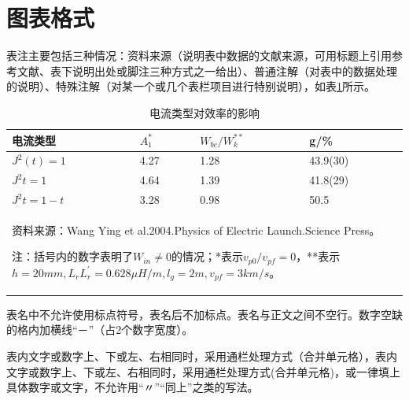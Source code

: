 \documentclass{cqupt_thesis}
\begin{document}
    \section{图表格式}
    表注主要包括三种情况：资料来源（说明表中数据的文献来源，可用标题上引用参考文献、表下说明出处或脚注三种方式之一给出）、普通注解（对表中的数据处理的说明）、特殊注解（对某一个或几个表栏项目进行特别说明），如表\ref{电流类型对效率的影响}所示。
    \begin{table}[H]%
        \centering
        \caption{电流类型对效率的影响}
        \label{电流类型对效率的影响}
        \begin{tabular}{p{3.5cm}p{3.5cm}p{3.5cm}p{3.5cm}}
            \hline
            电流类型           & {$ A_1^* $} & {$ W_{bc}/W_k^{**} $} & {g/\%}   \\
            \hline
            {$ J^2(t)=1 $} & 4.27        & 1.28                  & 43.9(30)            \\
            {$ J^2t=1 $}   & 4.64        & 1.39                  & 41.8(29)            \\
            {$ J^2t=1-t $} & 3.28        & 0.98                  & 50.5     \\
            \hline
            \multicolumn{4}{p{15cm}}{
                资料来源：Wang Ying et al.2004.Physics of Electric Launch.Science Press。

                注：括号内的数字表明了$ W_{in}\neq0 $的情况；*表示$ v_{p0}/v_{pf}=0 $，**表示$ h=20mm,L_rL_r^\prime=0.628\mu H/m,l_g=2m,v_{pf}=3km/s $。
            }
        \end{tabular}
    \end{table}
    表名中不允许使用标点符号，表名后不加标点。表名与正文之间不空行。数字空缺的格内加横线“－”（占2个数字宽度）。

    表内文字或数字上、下或左、右相同时，采用通栏处理方式（合并单元格），表内文字或数字上、下或左、右相同时，采用通栏处理方式(合并单元格)，或一律填上具体数字或文字，不允许用“〃”“同上”之类的写法。
\end{document}
